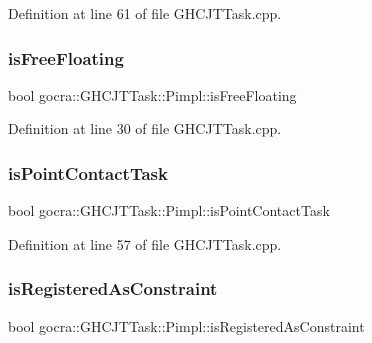 Definition at line 61 of file G\+H\+C\+J\+T\+Task.\+cpp.

\hypertarget{structgocra_1_1GHCJTTask_1_1Pimpl_a3fefbc36e9c5e9b8c4fc8f85fb19da53}{}\label{structgocra_1_1GHCJTTask_1_1Pimpl_a3fefbc36e9c5e9b8c4fc8f85fb19da53} 
\subsubsection{\texorpdfstring{is\+Free\+Floating}{isFreeFloating}}
{\footnotesize\ttfamily bool gocra\+::\+G\+H\+C\+J\+T\+Task\+::\+Pimpl\+::is\+Free\+Floating}



Definition at line 30 of file G\+H\+C\+J\+T\+Task.\+cpp.

\hypertarget{structgocra_1_1GHCJTTask_1_1Pimpl_a900c0b0bf150ba085a300ff543054a36}{}\label{structgocra_1_1GHCJTTask_1_1Pimpl_a900c0b0bf150ba085a300ff543054a36} 
\subsubsection{\texorpdfstring{is\+Point\+Contact\+Task}{isPointContactTask}}
{\footnotesize\ttfamily bool gocra\+::\+G\+H\+C\+J\+T\+Task\+::\+Pimpl\+::is\+Point\+Contact\+Task}



Definition at line 57 of file G\+H\+C\+J\+T\+Task.\+cpp.

\hypertarget{structgocra_1_1GHCJTTask_1_1Pimpl_aace8728a2e9a0271ea89aea0355c036b}{}\label{structgocra_1_1GHCJTTask_1_1Pimpl_aace8728a2e9a0271ea89aea0355c036b} 
\subsubsection{\texorpdfstring{is\+Registered\+As\+Constraint}{isRegisteredAsConstraint}}
{\footnotesize\ttfamily bool gocra\+::\+G\+H\+C\+J\+T\+Task\+::\+Pimpl\+::is\+Registered\+As\+Constraint}



